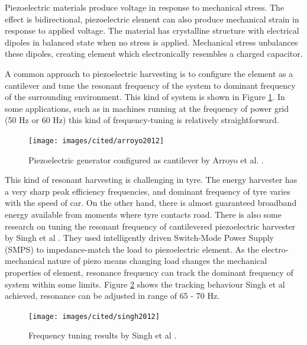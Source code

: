 Piezoelectric materials produce voltage in response to mechanical stress. The effect is bidirectional, piezoelectric element can also produce mechanical strain in response to applied voltage. The material has crystalline structure with electrical dipoles in balanced state when no stress is applied. Mechanical stress unbalances these dipoles, creating element which electronically resembles a charged capacitor. 

A common approach to piezoelectric harvesting is to configure the element as a cantilever and tune the resonant frequency of the system to dominant frequency of the surrounding environment. This kind of system is shown in Figure \ref{fiq:resonant_piezo}. In some applications, such as in machines running at the frequency of power grid (50 Hz or 60 Hz) this kind of frequency-tuning is relatively straightforward.

\begin{figure}[htb]
  \begin{center}
  \texttt{[image: images/cited/arroyo2012]}
  \end{center}
  \caption{Piezoelectric generator configured as cantilever by Arroyo et al. \cite{Arroyo2012}.}
  \label{fiq:resonant_piezo}
\end{figure}

This kind of resonant harvesting is challenging in tyre. The energy harvester has a very sharp peak efficiency frequencies, and dominant frequency of tyre varies with the speed of car. On the other hand, there is almost guaranteed broadband energy available from moments where tyre contacts road. There is also some research on tuning the resonant frequency of cantilevered piezoelectric harvester by Singh et al \cite{Singh2012}. They used intelligently driven Switch-Mode Power Supply (SMPS) to impedance-match the load to piezoelectric element. As the electro-mechanical nature of piezo means changing load changes the mechanical properties of element, resonance frequency can track the dominant frequency of system within some limits. Figure \ref{fiq:tracking_piezo} shows the tracking behaviour Singh et al achieved, resonance can be adjusted in range of 65 - 70 Hz.

\begin{figure}[htb]
  \begin{center}
  \texttt{[image: images/cited/singh2012]}
  \end{center}
  \caption{Frequency tuning results by Singh et al \cite{Singh2012}.}
  \label{fiq:tracking_piezo}
\end{figure}

